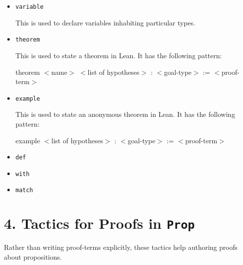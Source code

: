 \documentclass[12pt]{article}
\begin{document}
\begin{itemize}
  \item \texttt{variable}
  
  	This is used to declare variables inhabiting particular types.
  
  \item \texttt{theorem}
  
  	This is used to state a theorem in Lean. It has the following pattern:
  	
  	theorem $<$name$>$ $<$list of hypotheses$>$ : $<$goal-type$>$ := $<$proof-term$>$
  
  \item \texttt{example}
  
  This is used to state an anonymous theorem in Lean. It has the following pattern:
  	
  	example $<$list of hypotheses$>$ : $<$goal-type$>$ := $<$proof-term$>$
  
   \item \texttt{def}
  
  \item \texttt{with}
  \item \texttt{match}
\end{itemize}

\vspace{0.5cm}

\section*{4. Tactics for Proofs in \texttt{Prop}}
Rather than writing proof-terms explicitly, these tactics help authoring proofs about propositions. 
\end{document}
